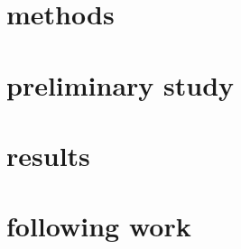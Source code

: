\begin{multicols}{2}
\section{methods}
\section{preliminary study}
\section{results}
\section{following work}


\end{multicols}







